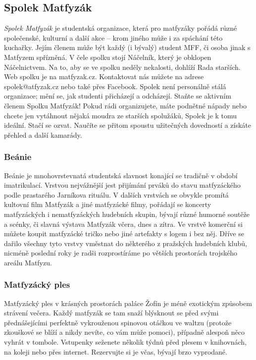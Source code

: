 \subsection{Spolek Matfyzák}

\textit{Spolek Matfyzák} je studentská organizace, která pro matfyzáky pořádá
různé společenské, kulturní a další akce – krom jiného může i za spáchání této
kuchařky. Jejím členem může být každý (i bývalý) student MFF, či osoba jinak s
Matfyzem spřízněná.
V čele spolku stojí Náčelník, který je obklopen Náčelnictvem. Na to, aby se ve
spolku neděly nekalosti, dohlíží Rada starších. Web spolku je na matfyzak.cz.
Kontaktovat nás můžete na adrese spolek@atfyzak.cz nebo také přes Facebook.
Spolek není personálně stálá organizace; mění se, jak studenti přicházejí a
odcházejí. Staňte se aktivním členem Spolku Matfyzák! Pokud rádi organizujete,
máte podnětné nápady nebo chcete jen vytáhnout nějaká moudra ze starších
spolužáků, Spolek je k tomu ideální. Stačí se ozvat. Naučíte se přitom spoustu
užitečných dovedností a získáte přehled a další kamarády.


\subsubsection{Beánie}

Beánie je mnohovrstevnatá studentská slavnost konající se tradičně v období
imatrikulací. Vrstvou nejvážnější jest přijímání prváků do stavu matfyzáckého
podle prastarého Jarníkova rituálu. V dalších vrstvách se obvykle promítá
kultovní film Matfyzák a jiné matfyzácké filmy, pořádají se koncerty
matfyzáckých i nematfyzáckých hudebních skupin, bývají různé humorné soutěže a
scénky, či slavná výstava Matfyzák včera, dnes a zítra. Ve vrstvě komerční si
můžete koupit matfyzácké tričko nebo jiné artefakty s logem i bez něj.
Dříve se dařilo všechny tyto vrstvy vměstnat do některého z pražských hudebních
klubů, nicméně poslední roky je radši rozprostíráme po větších prostorách
trojského areálu Matfyzu.

\subsubsection{Matfyzácký ples}

Matfyzácký ples v krásných prostorách paláce Žofín je méně exotickým způsobem
strávení večera. Každý matfyzák se tam snaží blýsknout se před svými
přednášejícími perfektně vykrouženou spinovou otáčkou ve waltzu (protože
zkouškové se blíží a nikdy nevíte, co vám může pomoci), případně alespoň něco
vyhrát v tombole. Vstupenky seženete několik týdnů před plesem v knihovnách, na
koleji nebo přes internet. Rezervujte si je včas, bývají brzo vyprodané.


